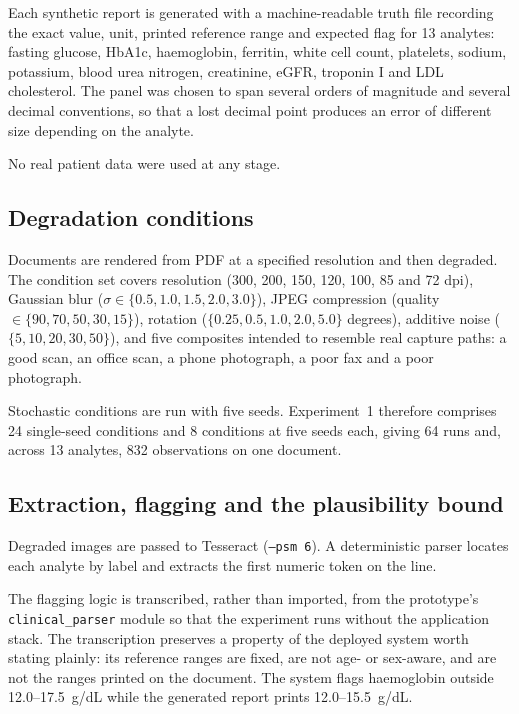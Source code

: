 \documentclass[11pt]{article}
\begin{document}
Each synthetic report is generated with a machine-readable truth file recording the exact value,
unit, printed reference range and expected flag for 13 analytes: fasting glucose, HbA1c,
haemoglobin, ferritin, white cell count, platelets, sodium, potassium, blood urea nitrogen,
creatinine, eGFR, troponin I and LDL cholesterol. The panel was chosen to span several orders of
magnitude and several decimal conventions, so that a lost decimal point produces an error of
different size depending on the analyte.

No real patient data were used at any stage.

\subsection{Degradation conditions}

Documents are rendered from PDF at a specified resolution and then degraded. The condition set
covers resolution (300, 200, 150, 120, 100, 85 and 72 dpi), Gaussian blur
($\sigma \in \{0.5, 1.0, 1.5, 2.0, 3.0\}$), JPEG compression (quality
$\in \{90, 70, 50, 30, 15\}$), rotation ($\{0.25, 0.5, 1.0, 2.0, 5.0\}$ degrees), additive
noise ($\{5, 10, 20, 30, 50\}$), and five composites intended to resemble real capture paths:
a good scan, an office scan, a phone photograph, a poor fax and a poor photograph.

Stochastic conditions are run with five seeds. Experiment~1 therefore comprises 24
single-seed conditions and 8 conditions at five seeds each, giving 64 runs and, across 13
analytes, 832 observations on one document.

\subsection{Extraction, flagging and the plausibility bound}

Degraded images are passed to Tesseract (\texttt{--psm 6}). A deterministic parser locates each
analyte by label and extracts the first numeric token on the line.

The flagging logic is transcribed, rather than imported, from the prototype's
\texttt{clinical\_parser} module so that the experiment runs without the application stack. The
transcription preserves a property of the deployed system worth stating plainly: its reference
ranges are fixed, are not age- or sex-aware, and are not the ranges printed on the document. The
system flags haemoglobin outside 12.0--17.5~g/dL while the generated
report prints 12.0--15.5~g/dL.
\end{document}
